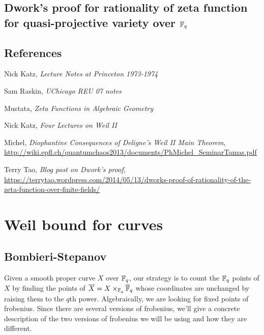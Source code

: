 \documentclass[letterpaper,11pt]{article}
\begin{document}
\subsection{Dwork's proof for rationality of zeta function for quasi-projective variety over $\mathbb{F}_q$}

\subsection{References}
\renewcommand{\refname}{General background of zeta function for varieties over $\FF_p$}
\begin{thebibliography}{3}
Nick Katz, 
\textit{Lecture Notes at Princeton 1973-1974}

Sam Raskin, 
\textit{UChicago REU 07 notes}

Mustata,
\textit{Zeta Functions in Algebraic Geometry}
\end{thebibliography}
\renewcommand{\refname}{Weil II}
\begin{thebibliography}{2}
Nick Katz,
\textit{Four Lectures on Weil II}

Michel,
\textit{Diophantine Consequences of Deligne's Weil II Main Theorem},
\url{http://wiki.epfl.ch/quantumchaos2013/documents/PhMichel_SeminarTamas.pdf}
\end{thebibliography}
\renewcommand{\refname}{Dwork's proof of rationality}
\begin{thebibliography}{1}
Terry Tao,
\textit{Blog post on Dwork's proof},
\url{https://terrytao.wordpress.com/2014/05/13/dworks-proof-of-rationality-of-the-zeta-function-over-finite-fields/}
\end{thebibliography}


\section{Weil bound for curves}

\subsection{Bombieri-Stepanov}

Given a smooth proper curve $X$ over $\mathbb{F}_q$, our strategy is to count the $\mathbb{F}_q$ points of $X$ by finding the points of $\overline{X} = X\times_{\mathbb{F}_q} \overline{\mathbb{F}}_q$ whose coordinates are unchanged by raising them to the $q$th power. Algebraically, we are looking for fixed points of frobenius. Since there are several versions of frobenius, we'll give a concrete description of the two versions of frobenius we will be using and how they are different.
\end{document}
